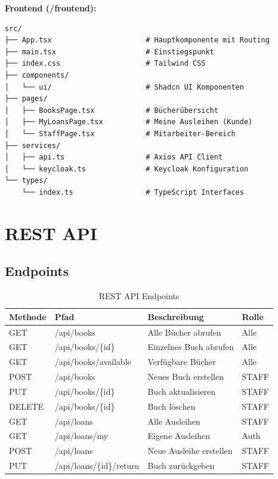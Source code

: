 \documentclass[a4paper,12pt,twoside]{report}
\begin{document}
\textbf{Frontend (/frontend):}
\begin{verbatim}
src/
├── App.tsx                      # Hauptkomponente mit Routing
├── main.tsx                     # Einstiegspunkt
├── index.css                    # Tailwind CSS
├── components/
│   └── ui/                      # Shadcn UI Komponenten
├── pages/
│   ├── BooksPage.tsx            # Bücherübersicht
│   ├── MyLoansPage.tsx          # Meine Ausleihen (Kunde)
│   └── StaffPage.tsx            # Mitarbeiter-Bereich
├── services/
│   ├── api.ts                   # Axios API Client
│   └── keycloak.ts              # Keycloak Konfiguration
└── types/
    └── index.ts                 # TypeScript Interfaces
\end{verbatim}

\newpage

\section{REST API}

\subsection{Endpoints}

\begin{table}[H]
\centering
\caption{REST API Endpoints}
\begin{tabularx}{\textwidth}{l l X l}
\toprule
\textbf{Methode} & \textbf{Pfad} & \textbf{Beschreibung} & \textbf{Rolle} \\
\midrule
GET & /api/books & Alle Bücher abrufen & Alle \\
GET & /api/books/\{id\} & Einzelnes Buch abrufen & Alle \\
GET & /api/books/available & Verfügbare Bücher & Alle \\
POST & /api/books & Neues Buch erstellen & STAFF \\
PUT & /api/books/\{id\} & Buch aktualisieren & STAFF \\
DELETE & /api/books/\{id\} & Buch löschen & STAFF \\
\midrule
GET & /api/loans & Alle Ausleihen & STAFF \\
GET & /api/loans/my & Eigene Ausleihen & Auth \\
POST & /api/loans & Neue Ausleihe erstellen & STAFF \\
PUT & /api/loans/\{id\}/return & Buch zurückgeben & STAFF \\
\bottomrule
\end{tabularx}
\end{table}
\end{document}
